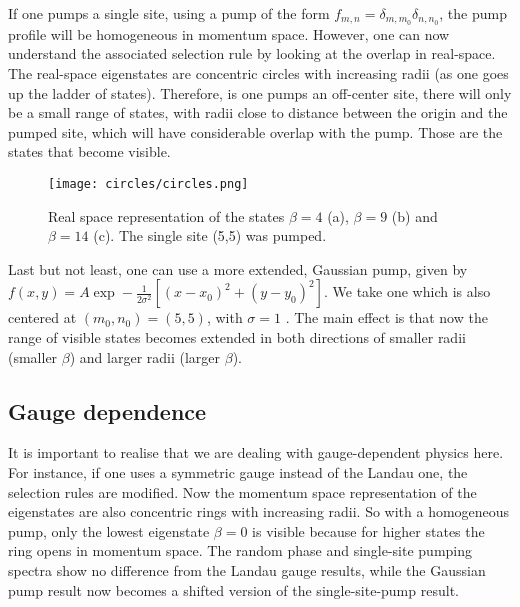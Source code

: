 \documentclass[twocolumn, 10pt, aps, superscriptaddress, floatfix, showpacs, prb, citeautoscript]{revtex4-1}
\newcommand{\co}[2]{#2}
\renewcommand{\paragraph}{\co}
\begin{document}
\paragraph{$\delta$-like pump}
If one pumps a single site, using a pump of the form $f_{m,n} =
\delta_{m,m_0} \delta_{n,n_0}$, the pump profile will be homogeneous
in momentum space.  However, one can now understand the associated
selection rule by looking at the overlap in real-space. The real-space
eigenstates are concentric circles with increasing radii (as one goes
up the ladder of states). Therefore, is one pumps an off-center site,
there will only be a small range of states, with radii close to
distance between the origin and the pumped site, which will have
considerable overlap with the pump. Those are the states that become
visible.

\begin{figure}[htb]
  \centerline{\texttt{[image: circles/circles.png]}}
  \caption{Real space representation of the states $\beta=4$ (a), $\beta=9$ (b) and $\beta=14$ (c). The single site (5,5) was pumped.}
  \label{fig:delta_real_sp}
\end{figure}


\paragraph{Gaussian pump}
Last but not least, one can use a more extended, Gaussian pump, given
by \(f(x,y) = A \exp- \frac{1}{2\sigma^2} \left[(x-x_0)^2 + (y-y_0)^2
\right]\). We take one which is also centered at \((m_0,n_0) = (5,5)\),
with \(\sigma =1\) . The main effect is that now the range of visible
states becomes extended in both directions of smaller radii (smaller
\(\beta\)) and larger radii (larger \(\beta\)).

\subsection{Gauge dependence}
\label{sec:gauge}
It is important to realise that we are dealing with gauge-dependent
physics here. For instance, if one uses a symmetric gauge instead of
the Landau one, the selection rules are modified. Now the momentum
space representation of the eigenstates are also concentric rings with
increasing radii. So with a homogeneous pump, only the lowest
eigenstate $\beta=0$ is visible because for higher states the ring
opens in momentum space. The random phase and single-site pumping
spectra show no difference from the Landau gauge results, while the
Gaussian pump result now becomes a shifted version of the
single-site-pump result.
\end{document}
